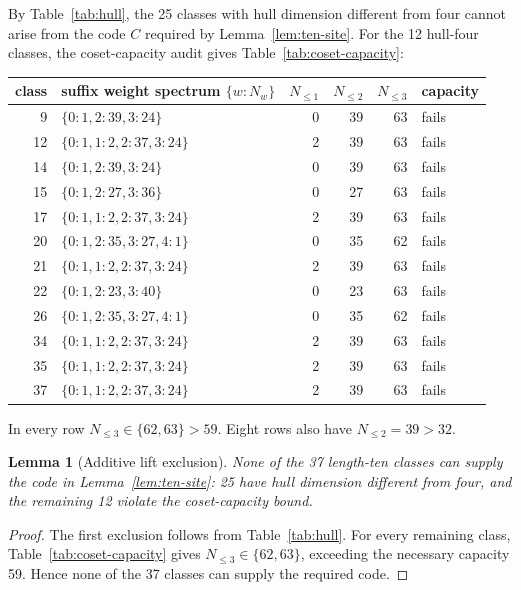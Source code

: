 \documentclass[11pt]{article}
\newtheorem{lemma}[theorem]{Lemma}
\begin{document}
By Table~\ref{tab:hull}, the 25 classes with hull dimension different from four cannot arise from the code \(C\) required by Lemma~\ref{lem:ten-site}. For the 12 hull-four classes, the coset-capacity audit gives Table~\ref{tab:coset-capacity}:

{\small
\setlength{\tabcolsep}{4pt}
\label{tab:coset-capacity}
\begin{tabularx}{\linewidth}{@{}rXrrrl@{}}
\toprule
class & suffix weight spectrum \(\{w:N_w\}\) & \(N_{\leq1}\) & \(N_{\leq2}\) & \(N_{\leq3}\) & capacity \\
\midrule
9 & \(\{0:1,2:39,3:24\}\) & 0 & 39 & 63 & fails \\
12 & \(\{0:1,1:2,2:37,3:24\}\) & 2 & 39 & 63 & fails \\
14 & \(\{0:1,2:39,3:24\}\) & 0 & 39 & 63 & fails \\
15 & \(\{0:1,2:27,3:36\}\) & 0 & 27 & 63 & fails \\
17 & \(\{0:1,1:2,2:37,3:24\}\) & 2 & 39 & 63 & fails \\
20 & \(\{0:1,2:35,3:27,4:1\}\) & 0 & 35 & 62 & fails \\
21 & \(\{0:1,1:2,2:37,3:24\}\) & 2 & 39 & 63 & fails \\
22 & \(\{0:1,2:23,3:40\}\) & 0 & 23 & 63 & fails \\
26 & \(\{0:1,2:35,3:27,4:1\}\) & 0 & 35 & 62 & fails \\
34 & \(\{0:1,1:2,2:37,3:24\}\) & 2 & 39 & 63 & fails \\
35 & \(\{0:1,1:2,2:37,3:24\}\) & 2 & 39 & 63 & fails \\
37 & \(\{0:1,1:2,2:37,3:24\}\) & 2 & 39 & 63 & fails \\
\bottomrule
\end{tabularx}
}

In every row \(N_{\leq3}\in\{62,63\}>59\). Eight rows also have \(N_{\leq2}=39>32\).

\begin{lemma}[Additive lift exclusion]\label{lem:additive-lift}
None of the 37 length-ten classes can supply the code in Lemma~\ref{lem:ten-site}: 25 have hull dimension different from four, and the remaining 12 violate the coset-capacity bound.
\end{lemma}
\begin{proof}
The first exclusion follows from Table~\ref{tab:hull}. For every remaining class, Table~\ref{tab:coset-capacity} gives \(N_{\leq3}\in\{62,63\}\), exceeding the necessary capacity 59. Hence none of the 37 classes can supply the required code.
\end{proof}
\end{document}
